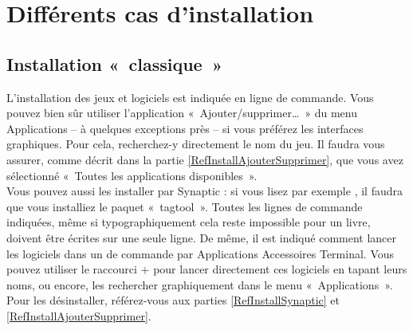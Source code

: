 \section{Différents cas d'installation}
\label{RefInstallJeuEtLogiciel}
\subsection{Installation «~classique~»}
L'installation des jeux et logiciels est indiquée en ligne de commande. Vous pouvez bien sûr utiliser l'application «~Ajouter/supprimer\dots{}~» du menu Applications -- à quelques exceptions près -- si vous préférez les interfaces graphiques. Pour cela, recherchez-y directement le nom du jeu. Il faudra vous assurer, comme décrit dans la partie \ref{RefInstallAjouterSupprimer}, que vous avez sélectionné «~Toutes les applications disponibles~».\\
Vous pouvez aussi les installer par Synaptic : si vous lisez par exemple , il faudra que vous installiez le paquet «~tagtool~». Toutes les lignes de commande indiquées, même si typographiquement cela reste impossible pour un livre, doivent être écrites sur une seule ligne. De même, il est indiqué comment lancer les logiciels dans un  de commande par Applications \FlecheDroite Accessoires \FlecheDroite Terminal. Vous pouvez utiliser le raccourci  +  pour lancer directement ces logiciels en tapant leurs noms, ou encore, les rechercher graphiquement dans le menu «~Applications~».\\ Pour les désinstaller, référez-vous aux parties \ref{RefInstallSynaptic} et \ref{RefInstallAjouterSupprimer}.
